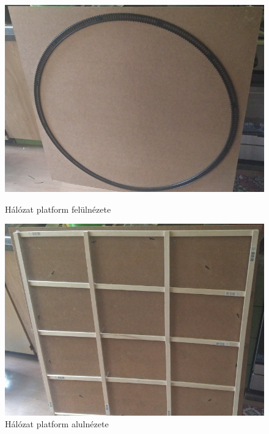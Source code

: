\documentclass[a4paper,12pt]{article}
\begin{document}
\begin{figure}[htp]
    \centering
    \begin{minipage}{0.45\textwidth}
        \centering
        \includegraphics[width=\textwidth]{images/railnetworkplatformfront.png}
        \caption[Hálózat platform felül]{Hálózat platform felülnézete}
		\label{fig:railnetworkplatformfront}
    \end{minipage}\hfill
    \begin{minipage}{0.45\textwidth}
        \centering
        \includegraphics[width=\textwidth]{images/railnetworkplatfromback.png}
        \caption[Hálózat platform alul]{Hálózat platform alulnézete}
		\label{fig:railnetworkplatfromback}
    \end{minipage}
\end{figure}
\end{document}
